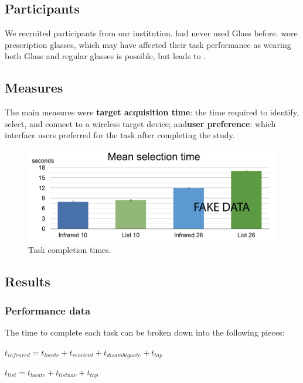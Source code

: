 \subsection{Participants}
We recruited  participants from our institution.  had never used Glass before.  wore prescription glasses, which may have affected their task performance as wearing both Glass and regular glasses is possible, but leads to .

\subsection{Measures}
The main measures were {\bf target acquisition time}: the time required to identify, select, and connect to a wireless target device; and{\bf user preference}: which interface users preferred for the task after completing the study.


\begin{figure}[t]
\centering
\includegraphics[width=1.0\columnwidth]{figures/selection-times2.pdf}
\caption{Task completion times. }
\label{fig:selection-times}
\end{figure}
\subsection{Results}

\subsubsection{Performance data}
The time to complete each task can be broken down into the following pieces:

$t_{infrared}=t_{locate}+t_{reorient}+t_{disambiguate}+t_{tap}$

$t_{list}=t_{locate}+t_{listnav}+t_{tap}$


